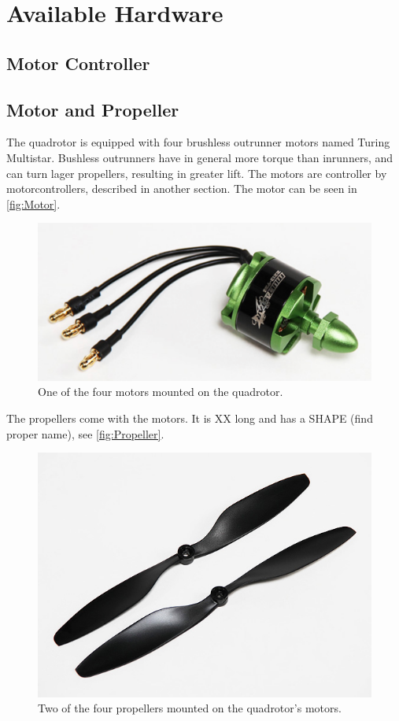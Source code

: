 \section{Available Hardware}

\subsection{Motor Controller}

\subsection{Motor and Propeller}
The quadrotor is equipped with four brushless outrunner motors named Turing Multistar. Bushless outrunners have in general more torque than inrunners, and can turn lager propellers, resulting in greater lift. The motors are controller by motorcontrollers, described in another section.
The motor can be seen in \autoref{fig:Motor}.
\begin{figure}[H]
	\centering
	\includegraphics[scale=0.5]{figures/motor.png}
	\caption{One of the four motors mounted on the quadrotor.}
	\label{fig:Motor}
\end{figure} The propellers come with the motors. It is XX long and has a SHAPE (find proper name), see \autoref{fig:Propeller}.

\begin{figure}[H]
	\centering
	\includegraphics[scale=0.4]{figures/propeller.png}
	\caption{Two of the four propellers mounted on the quadrotor's motors.}
	\label{fig:Propeller}
\end{figure}

